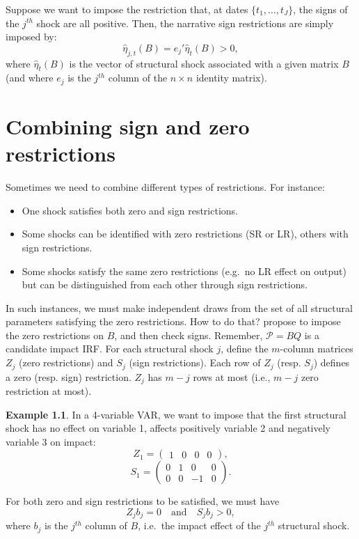 \documentclass[
  11pt,
]{book}
\providecommand{\tightlist}{%
  \setlength{\itemsep}{0pt}\setlength{\parskip}{0pt}}
\theoremstyle{definition}
\theoremstyle{definition}
\newtheorem{example}{Example}[chapter]
\theoremstyle{definition}
\theoremstyle{definition}
\theoremstyle{remark}
\begin{document}
Suppose we want to impose the restriction that, at dates \(\{t_1,\dots,t_J\}\), the signs of the \(j^{th}\) shock are all positive. Then, the narrative sign restrictions are simply imposed by:
\[
\hat{\eta}_{j,t}(B) = e_j'\hat\eta_{t}(B) > 0,
\]
where \(\hat\eta_{t}(B)\) is the vector of structural shock associated with a given matrix \(B\) (and where \(e_j\) is the \(j^{th}\) column of the \(n \times n\) identity matrix).

\chapter{Combining sign and zero restrictions}\label{SignsZeros}

Sometimes we need to combine different types of restrictions. For instance:

\begin{itemize}
\tightlist
\item
  One shock satisfies both zero and sign restrictions.
\item
  Some shocks can be identified with zero restrictions (SR or LR), others with sign restrictions.
\item
  Some shocks satisfy the same zero restrictions (e.g.~no LR effect on output) but can be distinguished from each other through sign restrictions.
\end{itemize}

In such instances, we must make independent draws from the set of all structural parameters satisfying the zero restrictions. How to do that? \citet{Arias_et_al_2018} propose to impose the zero restrictions on \(B\), and then check signs. Remember, \(\mathcal{P}=BQ\) is a candidate impact IRF. For each structural shock \(j\), define the \(m\)-column matrices \(Z_j\) (zero restrictions) and \(S_j\) (sign restrictions). Each row of \(Z_j\) (resp. \(S_j\)) defines a zero (resp. sign) restriction. \(Z_j\) has \(m-j\) rows at most (i.e., \(m-j\) zero restriction at most).

\begin{example}
\protect\hypertarget{exm:exMixSignSR}{}\label{exm:exMixSignSR}In a 4-variable VAR, we want to impose that the first structural shock has no effect on variable 1, affects positively variable 2 and negatively variable 3 on impact:
\[Z_1 = \begin{pmatrix}1 & 0 & 0 & 0\end{pmatrix}, \]
\[S_1 = \begin{pmatrix}0 & 1 & 0 & 0\\
0 & 0 & -1 & 0\end{pmatrix}. \]

For both zero and sign restrictions to be satisfied, we must have
\[
Z_jb_j=0 \quad \mbox{and} \quad S_jb_j>0,
\]
where \(b_j\) is the \(j^{th}\) column of \(B\), i.e.~the impact effect of the \(j^{th}\) structural shock.
\end{example}
\end{document}
